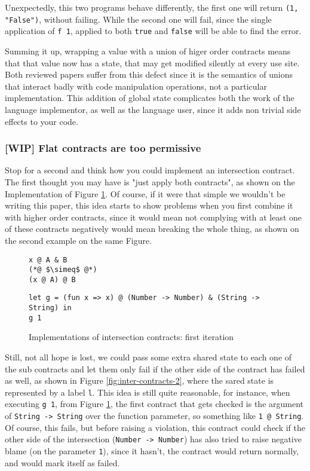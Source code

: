 \documentclass[sigplan,10pt,review,anonymous]{acmart}
\newcommand{\unsure}[2][1=]{}
\newcommand{\nickel}[1]{\lstinline[language=nickel]{#1}}
\begin{document}
Unexpectedly, this two programs behave differently, the first one will return
\nickel{(1, "False")}, without failing.
While the second one will fail, since the single application of \nickel{f 1},
applied to both \nickel{true} and \nickel{false} will be able to find the error.

Summing it up, wrapping a value with a union of higer order contracts means that
that value now has a state, that may get modified silently at every use site.
Both reviewed papers suffer from this defect since it is the semantics
of unions that interact badly with code manipulation operations,
not a particular implementation.
This addition of global state complicates both the work of the language
implementor, as well as the language user, since it adds non trivial
side effects to your code.
\unsure{Maybe mention CSE is actualy commonly done by hand as well}

\subsubsection*{[WIP] Flat contracts are too permissive}

Stop for a second and think how you could implement an intersection
contract. The first thought you may have is "just apply
both contracts", as shown on the Implementation of Figure \ref{fig:inter-contracts}.
Of course, if it were that simple we wouldn't be writing this paper,
this idea starts to show problems when you first combine it with
higher order contracts, since it would mean not complying with
at least one of these contracts negatively would mean breaking the
whole thing, as shown on the second example on the same Figure.

\begin{figure}[h]
\begin{lstlisting}[language=nickel, title=Implementation]
x @ A & B
(*@ $\simeq$ @*)
(x @ A) @ B
\end{lstlisting}
\begin{lstlisting}[language=nickel, title=Problem]
let g = (fun x => x) @ (Number -> Number) & (String -> String) in
g 1
\end{lstlisting}
\caption{Implementations of intersection contracts: first iteration}
\label{fig:inter-contracts}
\end{figure}

Still, not all hope is lost, we could pass some extra shared state
to each one of the sub contracts and let them only fail if the other
side of the contract has failed as well, as shown in Figure
\ref{fig:inter-contracts-2}, where the sared state is
represented by a label \nickel{l}.
This idea is still quite reasonable, for instance, when executing
\nickel{g 1}, from Figure \ref{fig:inter-contracts}, the first contract
that gets checked is the argument of \nickel{String -> String} over the function parameter, so
something like \nickel{1 @ String}.
Of course, this fails, but before raising a violation, this contract could
check if the other side of the intersection (\nickel{Number -> Number}) has
also tried to raise negative blame (on the parameter \nickel{1}), since
it hasn't, the contract would return normally, and would mark itself as failed.
\end{document}
